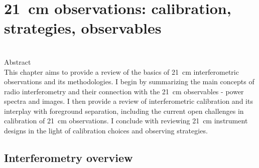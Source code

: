 \chapter{21~cm observations: calibration, strategies, observables}
\label{chapter:bernardi}

\begin{bf}
  \author{Gianni Bernardi (INAF-IRA \& Rhodes University)}\\
  
Abstract\\

This chapter aims to provide a review of the basics of 21~cm interferometric observations and its methodologies. I begin by summarizing the main concepts of radio interferometry and their connection with the 21~cm observables - power spectra and images. I then provide a review of interferometric calibration and its interplay with foreground separation, including the current open challenges in calibration of 21~cm observations. I conclude with reviewing 21~cm instrument designs in the light of calibration choices and observing strategies.
\end{bf}



\section{Interferometry overview}

